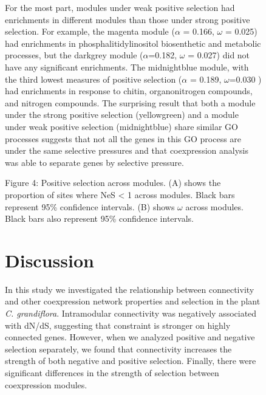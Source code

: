 \begin{figure}[ht!]
For the most part, modules under weak positive selection had enrichments in different modules than those under strong positive selection. For example, the magenta module ($\alpha$ = 0.166, $\omega$ = 0.025) had enrichments in phosphalitidylinositol biosenthetic and metabolic processes, but the darkgrey module ($\alpha$=0.182, $\omega$ = 0.027) did not have any significant enrichments. The midnightblue module, with the third lowest measures of positive selection ($\alpha$ = 0.189, $\omega$=0.030 ) had enrichments in response to chitin, organonitrogen compounds, and nitrogen compounds. The surprising result that both a module under the strong positive selection (yellowgreen) and a module under weak positive selection (midnightblue) share similar GO processes suggests that not all the genes in this GO process are under the same selective pressures and that coexpression analysis was able to separate genes by selective pressure.


Figure 4: Positive selection across modules. (A) shows the proportion of sites where NeS < 1 across modules. Black bars represent 95\% confidence intervals. (B) shows $\omega$ across modules. Black bars also represent 95\% confidence intervals.

\section{Discussion}

In this study we investigated the relationship between connectivity and other coexpression network properties and selection in the plant \textit{C. grandiflora}. Intramodular connectivity was negatively associated with dN/dS, suggesting that constraint is stronger on highly connected genes. However, when we analyzed positive and negative selection separately, we found that connectivity increases the strength of both negative and positive selection. Finally, there were significant differences in the strength of selection between coexpression modules.


\end{figure}
